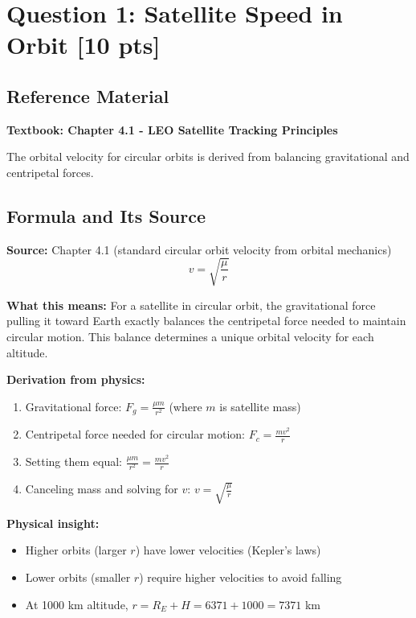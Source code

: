 \documentclass[11pt,letterpaper]{article}
\begin{document}
\section{Question 1: Satellite Speed in Orbit [10 pts]}

\subsection{Reference Material}
\textbf{Textbook: Chapter 4.1 - LEO Satellite Tracking Principles}

The orbital velocity for circular orbits is derived from balancing gravitational and centripetal forces.

\subsection{Formula and Its Source}

\textbf{Source:} Chapter 4.1 (standard circular orbit velocity from orbital mechanics)
\begin{equation}
v = \sqrt{\frac{\mu}{r}}
\end{equation}

\textbf{What this means:} For a satellite in circular orbit, the gravitational force pulling it toward Earth exactly balances the centripetal force needed to maintain circular motion. This balance determines a unique orbital velocity for each altitude.

\textbf{Derivation from physics:}
\begin{enumerate}
    \item Gravitational force: $F_g = \frac{\mu m}{r^2}$ (where $m$ is satellite mass)
    \item Centripetal force needed for circular motion: $F_c = \frac{m v^2}{r}$
    \item Setting them equal: $\frac{\mu m}{r^2} = \frac{m v^2}{r}$
    \item Canceling mass and solving for $v$: $v = \sqrt{\frac{\mu}{r}}$
\end{enumerate}

\textbf{Physical insight:}
\begin{itemize}
    \item Higher orbits (larger $r$) have lower velocities (Kepler's laws)
    \item Lower orbits (smaller $r$) require higher velocities to avoid falling
    \item At 1000 km altitude, $r = R_E + H = 6371 + 1000 = 7371$ km
\end{itemize}
\end{document}
